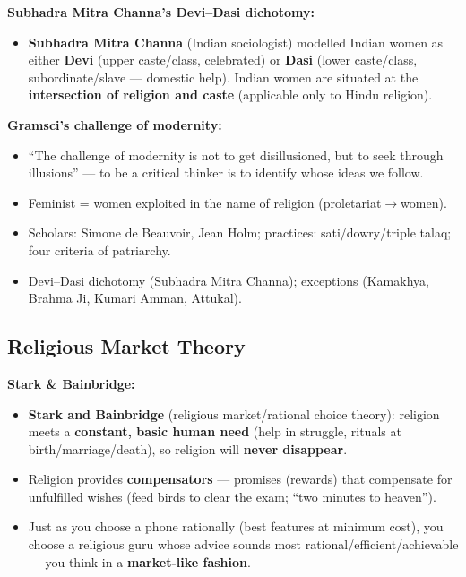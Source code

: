 \begin{KeyConcept}
\textbf{Subhadra Mitra Channa's Devi--Dasi dichotomy:}
\begin{itemize}
\item \textbf{Subhadra Mitra Channa} (Indian sociologist) modelled Indian women as either \textbf{Devi} (upper caste/class, celebrated) or \textbf{Dasi} (lower caste/class, subordinate/slave --- domestic help). Indian women are situated at the \textbf{intersection of religion and caste} (applicable only to Hindu religion).
\end{itemize}
\end{KeyConcept}

\begin{CriticalPoint}
\textbf{Gramsci's challenge of modernity:}
\begin{itemize}
\item ``The challenge of modernity is not to get disillusioned, but to seek through illusions'' --- to be a critical thinker is to identify whose ideas we follow.
\end{itemize}
\end{CriticalPoint}

\begin{QuickRevision}
\begin{itemize}
\item Feminist = women exploited in the name of religion (proletariat$\rightarrow$women).
\item Scholars: Simone de Beauvoir, Jean Holm; practices: sati/dowry/triple talaq; four criteria of patriarchy.
\item Devi--Dasi dichotomy (Subhadra Mitra Channa); exceptions (Kamakhya, Brahma Ji, Kumari Amman, Attukal).
\end{itemize}
\end{QuickRevision}

\sectiondivider

\subsection{Religious Market Theory}

\begin{KeyConcept}
\textbf{Stark \& Bainbridge:}
\begin{itemize}
\item \textbf{Stark and Bainbridge} (religious market/rational choice theory): religion meets a \textbf{constant, basic human need} (help in struggle, rituals at birth/marriage/death), so religion will \textbf{never disappear}.
\item Religion provides \textbf{compensators} --- promises (rewards) that compensate for unfulfilled wishes (feed birds to clear the exam; ``two minutes to heaven'').
\item Just as you choose a phone rationally (best features at minimum cost), you choose a religious guru whose advice sounds most rational/efficient/achievable --- you think in a \textbf{market-like fashion}.
\end{itemize}
\end{KeyConcept}

